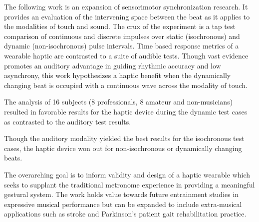 
\setlength{\parskip}{1em}
\setlength{\parindent}{0em}

\noindent

The following work is an expansion of sensorimotor synchronization research. It provides an evaluation of the intervening space between the beat as it applies to the modalities of touch and sound. The crux of the experiment is a tap test comparison of continuous and discrete impulses over static (isochronous) and dynamic (non-isochronous) pulse intervals. Time based response metrics of a wearable haptic are contrasted to a suite of audible tests. Though vast evidence promotes an auditory advantage in guiding rhythmic accuracy and low asynchrony, this work hypothesizes a haptic benefit when the dynamically changing beat is occupied with a continuous wave across the modality of touch. 

The analysis of 16 subjects (8 professionals, 8 amateur and non-musicians) resulted in favorable results for the haptic device during the dynamic test cases as contrasted to the auditory test results.

Though the auditory modality yielded the best results for the isochronous test cases, the haptic device won out for non-isochronous or dynamically changing beats.


The overarching goal is to inform validity and design of a haptic wearable which seeks to supplant the traditional metronome experience in providing a meaningful gestural system. The work holds value towards future entrainment studies in expressive musical performance but can be expanded to include extra-musical applications such as stroke and Parkinson's patient gait rehabilitation practice.